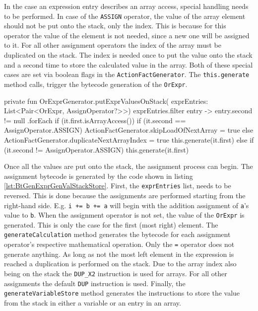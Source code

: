 In the case an expression entry describes an array access, special handling needs to be performed. In case of the \verb|ASSIGN| operator, the value of the array element should not be put onto the stack, only the index. This is because for this operator the value of the element is not needed, since a new one will be assigned to it. For all other assignment operators the index of the array must be duplicated on the stack. The index is needed once to put the value onto the stack and a second time to store the calculated value in the array. Both of these special cases are set via boolean flags in the \verb|ActionFactGenerator|. The \verb|this.generate| method calls, trigger the bytecode generation of the \verb|OrExpr|.


\begin{KotlinCode}[float,numbers=none,caption=Implementation of the \texttt{putExprValuesOnStack} extension function in the \texttt{ExpressionGenerator}., label=lst:BtGenExprGenValStack]
    private fun OrExprGenerator.putExprValuesOnStack(
        exprEntries: List<Pair<OrExpr, AssignOperator?>>) {
        exprEntries.filter { entry ->
            entry.second != null
        }.forEach {
            if (it.first.isArrayAccess()) {
                if (it.second == AssignOperator.ASSIGN) {
                    ActionFactGenerator.skipLoadOfNextArray = true
                } else {
                    ActionFactGenerator.duplicateNextArrayIndex = true
                }
                this.generate(it.first)
            } else {
                if (it.second != AssignOperator.ASSIGN) {
                    this.generate(it.first)
                }
            }
        }
    }
    \end{KotlinCode}


Once all the values are put onto the stack, the assignment process can begin. The assignment bytecode is generated by the code shown in listing \ref{lst:BtGenExprGenValStackStore}. First, the \verb|exprEntries| list, needs to be reversed. This is done because the assignments are performed starting from the right-hand side. E.g. \verb|i += b += a| will begin with the addition assignment of \verb|a|'s value to \verb|b|. When the assignment operator is not set, the value of the \verb|OrExpr| is generated. This is only the case for the first (most right) element. The \verb|generateCalculation| method generates the bytecode for each assignment operator's respective mathematical operation. Only the \verb|=| operator does not generate anything. As long as not the most left element in the expression is reached a duplication is performed on the stack. Due to the array index also being on the stack the \verb|DUP_X2| instruction is used for arrays. For all other assignments the default \verb|DUP| instruction is used. Finally, the \verb|generateVariableStore| method generates the instructions to store the value from the stack in either a variable or an entry in an array.

